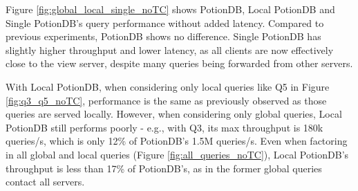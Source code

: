 \documentclass[sigplan,review,anonymous]{acmart}
\begin{document}
Figure \ref{fig:global_local_single_noTC} shows PotionDB, Local PotionDB and Single PotionDB's query performance without added latency.
Compared to previous experiments, PotionDB shows no difference.
Single 
PotionDB has slightly higher throughput and lower latency, as all clients are now effectively close to the view server, despite many queries being forwarded from other servers. %

With Local PotionDB, when considering only local queries like Q5 in Figure \ref{fig:q3_q5_noTC}, performance is the same as previously observed as those queries are served locally.
However, when considering only global queries, Local PotionDB still performs poorly - e.g., with Q3, its max throughput is 180k queries/s, which is only 12\% of PotionDB's 1.5M queries/s.
Even when factoring in all global and local queries (Figure \ref{fig:all_queries_noTC}), Local PotionDB's throughput is less than 17\% of PotionDB's, as in the former global queries contact all servers.
\end{document}
